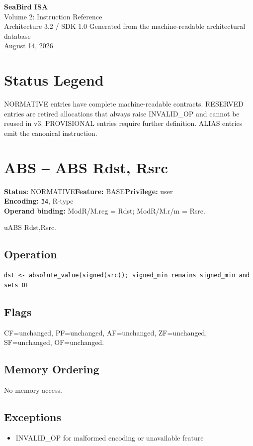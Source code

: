 \documentclass[10pt]{article}
\begin{document}
\begin{titlepage}\centering\vspace*{2cm}
{\Huge\bfseries SeaBird ISA\\[0.3cm]}{\LARGE Volume 2: Instruction Reference\\[0.4cm]}
{\Large Architecture 3.2 / SDK 1.0}\vfill
{\large Generated from the machine-readable architectural database\\August 14, 2026}\vfill
\end{titlepage}
\tableofcontents\clearpage
\section*{Status Legend}
NORMATIVE entries have complete machine-readable contracts. RESERVED entries are retired allocations that always raise INVALID\_OP and cannot be reused in v3. PROVISIONAL entries require further definition. ALIAS entries emit the canonical instruction.\clearpage
\section{ABS -- ABS Rdst, Rsrc}
\textbf{Status:} NORMATIVE\quad \textbf{Feature:} BASE\quad \textbf{Privilege:} user\\
\textbf{Encoding:} \texttt{34}, R-type\\
\textbf{Operand binding:} ModR/M.reg = Rdst; ModR/M.r/m = Rsrc.

uABS Rdst,Rsrc.

\subsection*{Operation}
\begin{lstlisting}
dst <- absolute_value(signed(src)); signed_min remains signed_min and sets OF
\end{lstlisting}
\subsection*{Flags}
CF=unchanged, PF=unchanged, AF=unchanged, ZF=unchanged, SF=unchanged, OF=unchanged.
\subsection*{Memory Ordering}
No memory access.
\subsection*{Exceptions}
\begin{itemize}
\item INVALID\_OP for malformed encoding or unavailable feature
\end{itemize}
\clearpage
\end{document}
